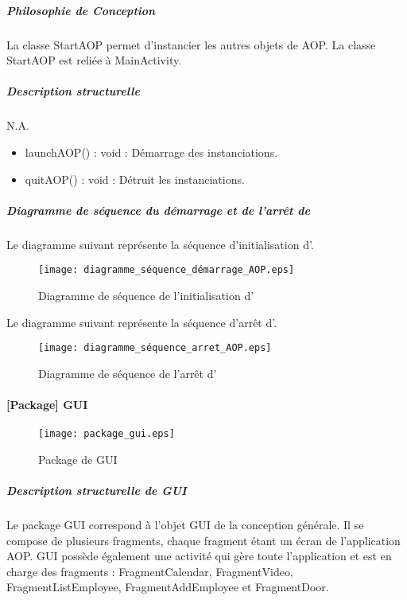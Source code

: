             \subparagraph{Philosophie de Conception}
            La classe StartAOP permet d'instancier les autres objets de AOP.  
            La classe StartAOP est reliée à MainActivity.            
            \subparagraph{Description structurelle}
                
            N.A.
            \begin{itemize}
                \item {launchAOP() : void : Démarrage des instanciations.}
                \item {quitAOP() : void : Détruit les instanciations.}
            \end{itemize}

        \subparagraph{Diagramme de séquence du démarrage et de l'arrêt de \appliA}

        Le diagramme suivant représente la séquence d'initialisation d'\appliA.
        \begin{figure} [H]
            \centering
            \texttt{[image: diagramme\_séquence\_démarrage\_AOP.eps]}
            \caption{Diagramme de séquence de l'initialisation d'\appliA}
            \label{Seq-Init-AOP}
        \end{figure}
    
        Le diagramme suivant représente la séquence d'arrêt d'\appliA.
        \begin{figure} [H]
            \centering
            \texttt{[image: diagramme\_séquence\_arret\_AOP.eps]}
            \caption{Diagramme de séquence de l'arrêt d'\appliA}
            \label{Seq-Arret-AOP}
        \end{figure}

\newpage

    \paragraph{[Package] GUI}

            \begin{figure} [H]
                \centering
                \texttt{[image: package\_gui.eps]}
                \caption{Package de GUI}
                \label{Package gui}
            \end{figure}
            \subparagraph{Description structurelle de GUI}%
            Le package GUI correspond à l'objet GUI de la conception générale.
            Il se compose de plusieurs fragments, chaque fragment étant un écran de l'application AOP.
            GUI possède également une activité qui gère toute l'application et est en charge des fragments : FragmentCalendar, FragmentVideo, FragmentListEmployee, FragmentAddEmployee et FragmentDoor.
            \newpage

